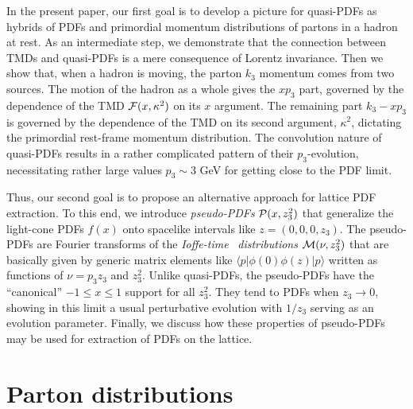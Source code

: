 \documentclass[aps,prd,twocolumn,showpacs,preprintnumbers,superscriptaddress,groupedaddress]{revtex4-1}
\begin{document}
In the present paper,  our  first goal 
 is to  develop   a picture for 
 quasi-PDFs as hybrids of PDFs and 
primordial 
momentum distributions of partons in a hadron at rest. 
As an intermediate step, we demonstrate  that the connection between 
TMDs and  quasi-PDFs
\cite{Radyushkin:2016hsy} is a mere consequence 
of  Lorentz invariance. Then we  show that, 
when a  hadron is moving, the parton $k_3$ momentum
comes from two sources. The motion
of the hadron as a whole gives 
the  $xp_3$  part,  governed by the dependence of
 the TMD  ${\cal F} (x, \kappa^2)$ on its $x$ argument.
  The remaining part $k_3-xp_3$   
is governed by the  dependence of the TMD  on its second argument,
$\kappa^2$, 
dictating    the primordial 
 rest-frame 
 momentum distribution.    The convolution  nature of quasi-PDFs 
 results in a rather complicated pattern of their 
 \mbox{$p_3$-evolution,} necessitating rather   large values $p_3 \sim 3$ GeV 
 for getting close to the PDF limit.
 
Thus, our second goal is to propose an alternative approach for 
lattice PDF extraction.   To this end, we introduce 
{\it pseudo-PDFs} $ {\cal P} (x, z_3^2) $  that generalize 
the light-cone PDFs $f(x)$ onto spacelike intervals like  
 $z=(0,0,0,z_3)$.   The pseudo-PDFs are Fourier transforms 
 of the  \mbox{{\it Ioffe-time}  \cite{Ioffe:1969kf}}  {\it distributions} \cite{Braun:1994jq}
 ${\cal M} (\nu, z_3^2)$ 
 that are  basically given by  generic matrix elements  like $  \langle p |   \phi(0) \phi (z)|p \rangle $
 written as  functions of $\nu = p_3 z_3$ and $z_3^2$. 
 Unlike quasi-PDFs, the pseudo-PDFs have the ``canonical''  $-1 \leq x  \leq 1$ support
 for all $z_3^2$.  They  tend to  PDFs when  $z_3\to 0$, 
  showing in this limit  a usual perturbative evolution 
 with $1/z_3$ serving as an evolution parameter. 
 Finally, we discuss  how  these properties of  pseudo-PDFs  may be used 
 for extraction of  PDFs on the lattice.   
 
 


 
 

 
  
 
 
 \section{Parton distributions} 



  
\end{document}
